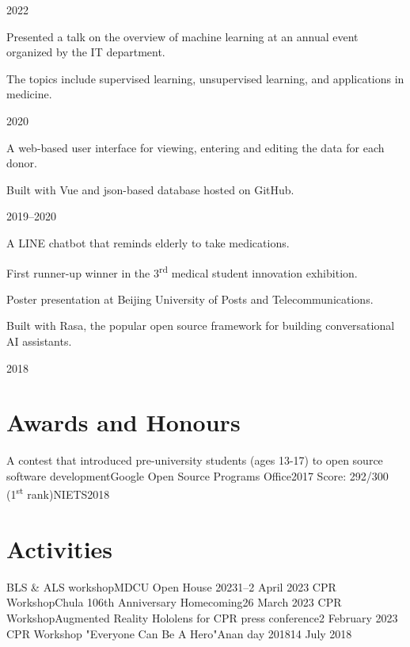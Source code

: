 \documentclass{cv}
\begin{document}
\begin{cv_table}
{  }{}{2022}
  {\begin{cv_itemize}
      \item Presented a talk on the overview of machine learning at an annual event organized by the IT department.
      \item The topics include supervised learning, unsupervised learning, and applications in medicine.
    \end{cv_itemize}
  }{}{2020}
  {\begin{cv_itemize}
      \item A web-based user interface for viewing, entering and editing the data for each donor.
      \item Built with Vue and json-based database hosted on GitHub.
    \end{cv_itemize}
  }{}{2019--2020}
  {\begin{cv_itemize}
      \item A LINE chatbot that reminds elderly to take medications.
      \item First runner-up winner in the 3\textsuperscript{rd} medical student innovation exhibition.
      \item Poster presentation at Beijing University of Posts and Telecommunications.
      \item Built with Rasa, the popular open source framework for building conversational AI assistants.
    \end{cv_itemize}
  }{}{2018}
\end{cv_table}

\section{Awards and Honours}
\begin{cv_table}
  {A contest that introduced pre-university students (ages 13-17) to open source software development}{Google Open Source Programs Office}{2017}
  {Score: 292/300 (1\textsuperscript{st} rank)}{NIETS}{2018}
\end{cv_table}

\section{Activities}
\begin{cv_table}
  {BLS \& ALS workshop}{MDCU Open House 2023}{1--2 April 2023}
  {CPR Workshop}{Chula 106th Anniversary Homecoming}{26 March 2023}
  {CPR Workshop}{Augmented Reality Hololens for CPR press conference}{2 February 2023}
  {CPR Workshop "Everyone Can Be A Hero"}{Anan day 2018}{14 July 2018}
\end{cv_table}
\end{document}
